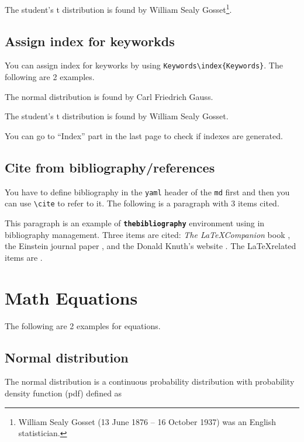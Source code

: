 \documentclass[10pt, a4paper, oneside]{book}
\begin{document}
The student's t distribution is found by William Sealy Gosset\footnote{William Sealy Gosset (13 June 1876 -- 16 October 1937) was an English statistician.}.

\section{Assign index for keyworkds}\label{assign-index-for-keyworkds}

You can assign index for keyworks by using \texttt{Keywords\textbackslash{}index\{Keywords\}}.
The following are 2 examples.

The normal distribution is found by Carl Friedrich Gauss.

The student's t distribution is found by William Sealy Gosset.

You can go to ``Index'' part in the last page to check if indexes are generated.

\section{Cite from bibliography/references}\label{cite-from-bibliographyreferences}

You have to define bibliography in the \texttt{yaml} header of the \texttt{md} first and then you can use \texttt{\textbackslash{}cite} to refer to it.
The following is a paragraph with 3 items cited.

This paragraph is an example of \textbf{\texttt{thebibliography}} environment using
in bibliography management. Three items are cited: \emph{The \LaTeX Companion}
book \cite{latexcompanion}, the Einstein journal paper \cite{einstein}, and the
Donald Knuth's website \cite{knuthwebsite}. The \LaTeX related items are
\cite{latexcompanion,knuthwebsite}.

\clearpage

\chapter{Math Equations}\label{math-equations}

The following are 2 examples for equations.

\section{Normal distribution}\label{normal-distribution}

The normal distribution is a continuous probability distribution with probability density function (pdf) defined as
\end{document}
